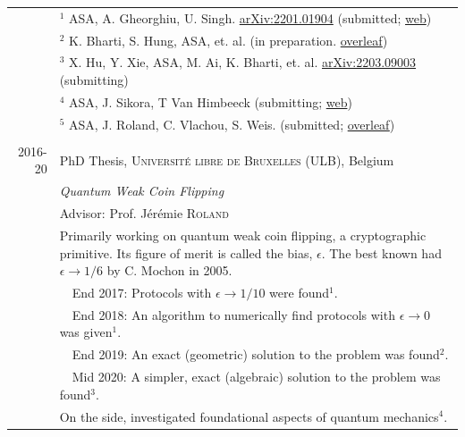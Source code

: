 \documentclass[a4paper,10pt]{article}
\begin{document}
\begin{longtable}{r|p{11cm}}
                    &\small{{\tiny $^1$} ASA, A. Gheorghiu, U. Singh. \href{https://arxiv.org/abs/2201.01904}{arXiv:2201.01904} (submitted; \href{https://atulsingharora.github.io/HQC}{web})}\\                                                                     
                    &\small{{\tiny $^2$} K. Bharti, S. Hung, ASA, et. al. (in preparation. \href{https://www.overleaf.com/read/qzxbvnsfnvxp}{overleaf}}) \\
                    &\small{{\tiny $^3$} X. Hu, Y. Xie, ASA, M. Ai, K. Bharti, et. al. \href{https://arxiv.org/abs/2203.09003}{arXiv:2203.09003} (submitting)}\\  
                    &\small{{\tiny $^4$} ASA, J. Sikora, T Van Himbeeck (submitting; \href{http://atulsingharora.github.io/DI_WCF}{web})}\\
                    &\small{{\tiny $^5$} ASA, J. Roland, C. Vlachou, S. Weis. (submitted; \href{https://www.overleaf.com/read/khztgjgdgvmm}{overleaf}})\\
  \multicolumn{2}{c}{} \\                   
 \textsc{2016-20}     & PhD Thesis, \textsc{Université libre de Bruxelles (ULB)}, Belgium \\
                    &\emph{Quantum Weak Coin Flipping} \\
                    &\small Advisor: Prof. Jérémie \textsc{Roland}\\
                    &\footnotesize{Primarily working on quantum weak coin flipping, a cryptographic primitive. Its figure of merit is called the bias, $\epsilon$. The best known had $\epsilon \to 1/6$ by C. Mochon in 2005.} \\
                    &\footnotesize{~~End 2017: Protocols with $\epsilon \to 1/10$ were found{\tiny $^1$}. }\\
                    &\footnotesize{~~End 2018: An algorithm to numerically find protocols with $\epsilon\to 0$ was given{\tiny $^1$}. }\\
                    &\footnotesize{~~End 2019: An exact (geometric) solution to the problem was found{\tiny $^2$}. }\\
                    &\footnotesize{~~Mid 2020: A simpler, exact (algebraic) solution to the problem was found{\tiny $^3$}. }\\
                    &\footnotesize{On the side, investigated foundational aspects of quantum mechanics{\tiny $^4$}. }\\

\end{longtable}
\end{document}
